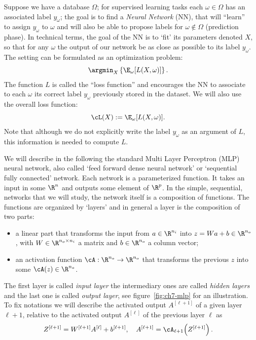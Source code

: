 Suppose we have a database $\Omega$; for supervised learning tasks each $\omega \in \Omega$ has an associated label $y_\omega$; the goal is to find a \emph{Neural Network} (NN), that will ``learn'' to assign $y_\omega$ to $\omega$ and will also be able to propose labels for $\omega \notin \Omega$ (prediction phase). In technical terms, the goal of the NN is to `fit' its parameters denoted $X$, so that for any $\omega$ the output of our network be as close as possible to its label $y_\omega$. The setting can be formulated as an optimization problem:
\begin{equation}\label{eq:ch7-argmin-loss}
  \argmin_X \left\{ \E_\omega [L(X, \omega)] \right\}.
\end{equation}
The function $L$ is called the ``loss function'' and encourages the NN to associate to each $\omega$ its correct label $y_\omega$ previously stored in the dataset. We will also use the overall loss function:
\begin{equation}\label{eq:ch7-overall-loss}
  \cL(X) := \E_\omega [L(X, \omega)].
\end{equation}
Note that although we do not explicitly write the label $y_\omega$ as an argument of $L$, this information is needed to compute $L$.

We will describe in the following the standard Multi Layer Perceptron (MLP) neural network, also called `feed forward dense neural network' or `sequential fully connected' network. Each network is a parameterized function. It takes an input in some $\R^n$ and outputs some element of $\R^p$. In the simple, sequential, networks that we will study, the network itself is a composition of functions. The functions are organized by `layers' and in general a layer is the composition of two parts:
\begin{itemize}
  \item a linear part that transforms the input from $a \in \R^{n_i}$ into $z = Wa + b \in \R^{n_o}$, with $W \in \R^{n_o \times n_i}$ a matrix and $b \in \R^{n_o}$ a column vector;
  \item an activation function $\cA : \R^{n_o} \to \R^{n_o}$ that transforms the previous $z$ into some $\cA(z) \in \R^{n_o}$.
\end{itemize}

The first layer is called \emph{input layer} the intermediary ones are called \emph{hidden layers} and the last one is called \emph{output layer}, see figure~\ref{fig:ch7-mlp} for an illustration. To fix notations we will describe the activated output $A^{[\ell+1]}$ of a given layer $\ell+1$, relative to the activated output $A^{[\ell]}$ of the previous layer $\ell$ as
\begin{equation}\label{eq:ch7-layer-update}
  Z^{[\ell+1]} = W^{[\ell+1]} A^{[\ell]} + b^{[\ell+1]}, \quad A^{[\ell+1]} = \cA_{\ell+1}\!\left( Z^{[\ell+1]} \right).
\end{equation}

